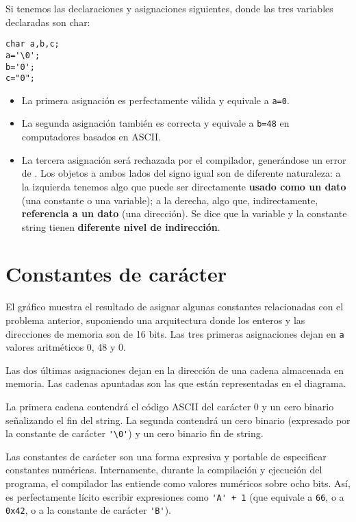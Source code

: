 \begin{ejemplo}
Si tenemos las declaraciones y asignaciones siguientes, donde las tres variables declaradas son char:
\begin{lstlisting}
char a,b,c;
a='\0';
b='0';
c="0";
\end{lstlisting}

\begin{itemize}
	\item La primera asignación es perfectamente válida y equivale a \lstinline{a=0}. 
	\item La segunda asignación también es correcta y equivale a \lstinline{b=48} en computadores basados en ASCII. 
 	\item La tercera asignación será rechazada por el compilador, generándose un error de . Los objetos a ambos lados del signo igual son de diferente naturaleza: a la izquierda tenemos algo que puede ser directamente \textbf{usado como un dato} (una constante o una variable); a la derecha, algo que, indirectamente, \textbf{referencia a un dato} (una dirección). Se dice que la variable y la constante string tienen \textbf{diferente nivel de indirección}.
\end{itemize}
\end{ejemplo}

\section{Constantes de carácter}
El gráfico muestra el resultado de asignar algunas constantes relacionadas con el problema anterior, suponiendo una arquitectura donde los enteros y las direcciones de memoria son de 16 bits. Las tres primeras asignaciones dejan en \lstinline{a} valores
aritméticos 0, 48 y 0.

Las dos últimas asignaciones dejan en  la dirección de una cadena almacenada en memoria. Las cadenas apuntadas son las que están representadas en el diagrama. 

La primera cadena contendrá el código ASCII del carácter 0 y un cero binario señalizando el fin del string. La
segunda contendrá un cero binario (expresado por la constante de carácter \lstinline{'\0'}) y un cero binario fin de string.

Las constantes de carácter son una forma expresiva y portable de especificar constantes numéricas.
Internamente, durante la compilación y ejecución del programa, el compilador las entiende como
valores numéricos sobre ocho bits. Así, es perfectamente lícito escribir expresiones como \lstinline{'A' + 1} (que
equivale a \lstinline{66}, o a \lstinline{0x42}, o a la constante de carácter \lstinline{'B'}).

